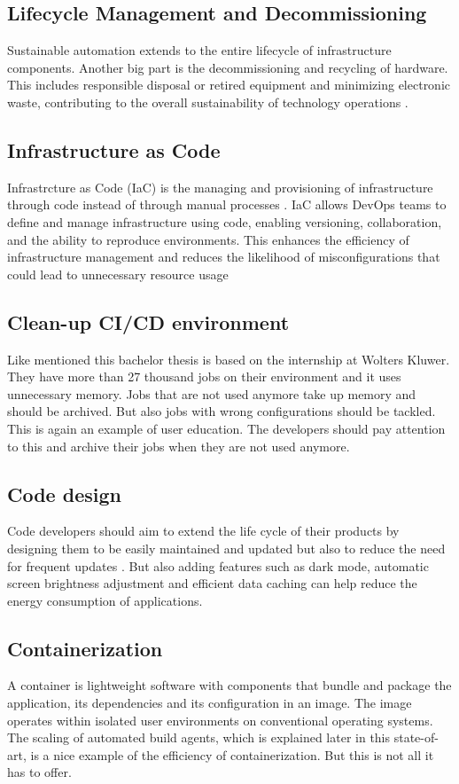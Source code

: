 \subsection{Lifecycle Management and Decommissioning}
Sustainable automation extends to the entire lifecycle of infrastructure components. Another big part is the decommissioning and recycling of hardware. This includes responsible disposal or retired equipment and minimizing electronic waste, contributing to the overall sustainability of technology operations \autocite{Festus2024}.


\subsection{Infrastructure as Code}
Infrastrcture as Code (IaC) is the managing and provisioning of infrastructure through code instead of through manual processes \autocite{RedHat2022}. IaC allows DevOps teams to define and manage infrastructure using code, enabling versioning, collaboration, and the ability to reproduce environments. This enhances the efficiency of infrastructure management and reduces the likelihood of misconfigurations that could lead to unnecessary resource usage \autocite{Festus2024}


\subsection{Clean-up CI/CD environment}
Like mentioned this bachelor thesis is based on the internship at Wolters Kluwer. They have more than 27 thousand jobs on their environment and it uses unnecessary memory. 
Jobs that are not used anymore take up memory and should be archived. But also jobs with wrong configurations should be tackled.
This is again an example of user education. The developers should pay attention to this and archive their jobs when they are not used anymore.


\subsection{Code design}
Code developers should aim to extend the life cycle of their products by designing them to be easily maintained and updated but also to reduce the need for frequent updates \autocite{Zudu2024}.
But also adding features such as dark mode, automatic screen brightness adjustment and efficient data caching can help reduce the energy consumption of applications.


\subsection{Containerization}
A container is lightweight software with components that bundle and package the application, its dependencies and its configuration in an image. The image operates within isolated user environments on conventional operating systems.
The scaling of automated build agents, which is explained later in this state-of-art, is a nice example of the efficiency of containerization. But this is not all it has to offer.

